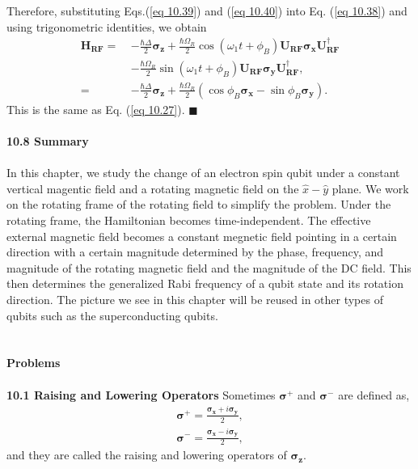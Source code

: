 \documentclass{article}
\begin{document}
Therefore, substituting Eqs.(\ref{eq 10.39}) and (\ref{eq 10.40}) into Eq. (\ref{eq 10.38}) and using trigonometric identities, we obtain
\begin{align*}\label{eq 10.41}
    \boldsymbol{H_{RF}}=\ &-\frac{\hbar\varDelta}{2}\boldsymbol{\sigma_z}+
    \frac{\hbar\varOmega_R}{2}\cos(\omega_1t+\phi_B)\boldsymbol{U_{RF}\sigma_x}\boldsymbol{U}^\dagger_{\boldsymbol{RF}}\\
    &-\frac{\hbar\varOmega_R}{2}\sin(\omega_1t+\phi_B)\boldsymbol{U_{RF}\sigma_y}\boldsymbol{U}^\dagger_{\boldsymbol{RF}},\\
    =\ &-\frac{\hbar\varDelta}{2}\boldsymbol{\sigma_z}+\frac{\hbar\varOmega_R}{2}(\cos\phi_B\boldsymbol{\sigma_x}-\sin\phi_B\boldsymbol{\sigma_y}).\tag{10.41}
\end{align*}
This is the same as Eq. (\ref{eq 10.27}). \hfill $\blacksquare$\\\\
\textbf{\large 10.8 Summary}\\\\
In this chapter, we study the change of an electron spin qubit under a constant vertical magentic field and 
a rotating magnetic field on the $\hat{x}-\hat{y}$ plane. We work on the rotating frame of 
the rotating field to simplify the problem. Under the rotating frame, the Hamiltonian becomes time-independent.
The effective external magnetic field becomes a constant megnetic field pointing in a certain
direction with a certain magnitude determined by the phase, frequency, and magnitude of 
the rotating magnetic field and the magnitude of the DC field. This then determines
the generalized Rabi frequency of a qubit state and its rotation direction. The picture we see in this chapter
will be reused in other types of qubits such as the superconducting qubits.\\\\\\
\textbf{\large Problems}\\\\
\textbf{10.1 Raising and Lowering Operators}
Sometimes $\boldsymbol{\sigma^+}$ and $\boldsymbol{\sigma^-}$ are defined as,
\begin{align*}
    \boldsymbol{\sigma^+}=\frac{\boldsymbol{\sigma_x}+i\boldsymbol{\sigma_y}}{2},\\
    \boldsymbol{\sigma^-}=\frac{\boldsymbol{\sigma_x}-i\boldsymbol{\sigma_y}}{2},\tag{10.42}
\end{align*}
and they are called the raising and lowering operators of $\boldsymbol{\sigma_z}$.
\end{document}
